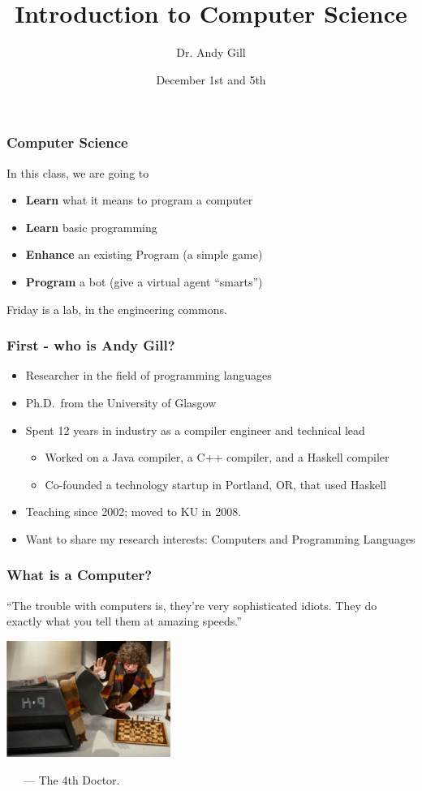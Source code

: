 \documentclass{beamer}
\title[CS]{Introduction to Computer Science}
\author[Andy Gill]{Dr. Andy Gill}
\institute{Electrical Engineering and Computer Science}
\date{December 1st and 5th}
\begin{document}
\frame{\titlepage}

\begin{frame}
\frametitle{Computer Science}
\Large

In this class, we are going to

\frameskip{}
\begin{itemize}
\item {\bf Learn} what it means to program a computer
\item {\bf Learn} basic programming
\item {\bf Enhance} an existing Program (a simple game)
\item {\bf Program} a bot (give a virtual agent ``smarts'')
\end{itemize}
\frameskip{}

Friday is a lab, in the engineering commons.
\end{frame}


\begin{frame}
\frametitle{First - who is Andy Gill?}
\Large

\begin{itemize}
\item Researcher in the field of programming languages
\item Ph.D.\ from the University of Glasgow
\item Spent 12 years in industry as a compiler engineer and technical lead
\begin{itemize}
\item Worked on a Java compiler, a C++ compiler, and a Haskell compiler 
\item Co-founded a technology startup in Portland, OR, that used Haskell
\end{itemize}
\item Teaching since 2002; moved to KU in 2008.
\item Want to share my research interests: Computers and Programming Languages
\end{itemize}

\end{frame}

\begin{frame}
\frametitle{What is a Computer?}
\large

``The trouble with computers is, they're very sophisticated idiots. They do exactly what you tell them at amazing speeds.'' 

\begin{center}
\includegraphics[width=0.4\textwidth]{computersanddoctorwho.jpg}
\end{center}


~~~--- The 4th Doctor.

\end{frame}
\end{document}
